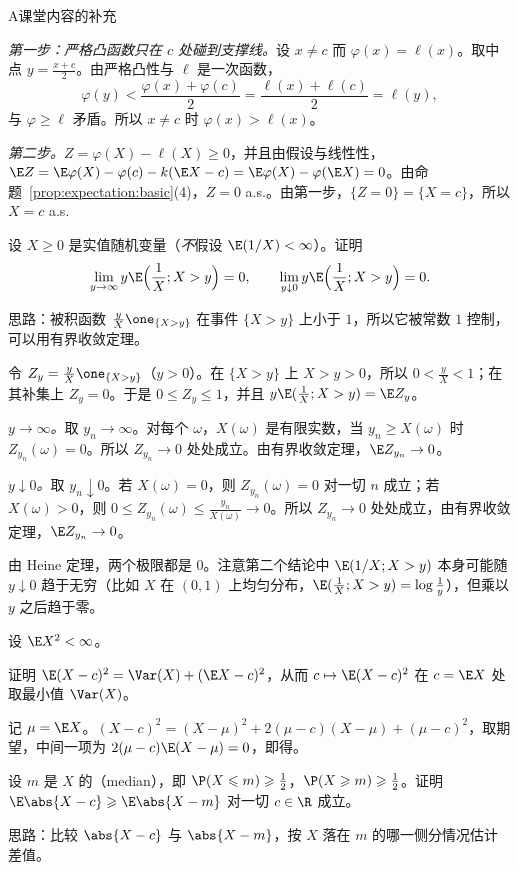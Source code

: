 \begin{exercises}{A}{课堂内容的补充}
\begin{solution}
\emph{第一步：严格凸函数只在 $c$ 处碰到支撑线。}设 $x\neq c$ 而 $\varphi(x)=\ell(x)$。取中点 $y=\frac{x+c}2$。由严格凸性与 $\ell$ 是一次函数，
\[
\varphi(y)<\frac{\varphi(x)+\varphi(c)}2=\frac{\ell(x)+\ell(c)}2=\ell(y),
\]
与 $\varphi\geqslant\ell$ 矛盾。所以 $x\neq c$ 时 $\varphi(x)>\ell(x)$。

\emph{第二步。}$Z=\varphi(X)-\ell(X)\geqslant0$，并且由假设与线性性，$\E Z=\E\varphi(X)-\varphi(c)-k(\E X-c)=\E\varphi(X)-\varphi(\E X)=0$。由命题~\ref{prop:expectation:basic}(4)，$Z=0$ a.s.。由第一步，$\{Z=0\}=\{X=c\}$，所以 $X=c$ a.s.
\end{solution}

\item\label{ex:expectation:A7} 设 $X\geqslant0$ 是实值随机变量（\emph{不}假设 $\E(1/X)<\infty$）。证明
\[
\lim_{y\to\infty}y\E\Bigl(\frac1X;X>y\Bigr)=0,\qquad\lim_{y\downarrow0}y\E\Bigl(\frac1X;X>y\Bigr)=0 .
\]
\begin{solution}
思路：被积函数 $\frac yX\one_{\{X>y\}}$ 在事件 $\{X>y\}$ 上小于 $1$，所以它被常数 $1$ 控制，可以用有界收敛定理。

令 $Z_y=\frac yX\one_{\{X>y\}}$（$y>0$）。在 $\{X>y\}$ 上 $X>y>0$，所以 $0<\frac yX<1$；在其补集上 $Z_y=0$。于是 $0\leqslant Z_y\leqslant1$，并且 $y\E(\frac1X;X>y)=\E Z_y$。

\emph{$y\to\infty$。}取 $y_n\to\infty$。对每个 $\omega$，$X(\omega)$ 是有限实数，当 $y_n\geqslant X(\omega)$ 时 $Z_{y_n}(\omega)=0$。所以 $Z_{y_n}\to0$ 处处成立。由有界收敛定理，$\E Z_{y_n}\to0$。

\emph{$y\downarrow0$。}取 $y_n\downarrow0$。若 $X(\omega)=0$，则 $Z_{y_n}(\omega)=0$ 对一切 $n$ 成立；若 $X(\omega)>0$，则 $0\leqslant Z_{y_n}(\omega)\leqslant\frac{y_n}{X(\omega)}\to0$。所以 $Z_{y_n}\to0$ 处处成立，由有界收敛定理，$\E Z_{y_n}\to0$。

由 Heine 定理，两个极限都是 $0$。注意第二个结论中 $\E(1/X;X>y)$ 本身可能随 $y\downarrow0$ 趋于无穷（比如 $X$ 在 $(0,1)$ 上均匀分布，$\E(\frac1X;X>y)=\log\frac1y$），但乘以 $y$ 之后趋于零。
\end{solution}

\item\label{ex:expectation:A8} 设 $\E X^2<\infty$。
\begin{questions}
\item 证明 $\E(X-c)^2=\Var(X)+(\E X-c)^2$，从而 $c\mapsto \E(X-c)^2$ 在 $c=\E X$ 处取最小值 $\Var(X)$。
\begin{solution}
记 $\mu=\E X$。$(X-c)^2=(X-\mu)^2+2(\mu-c)(X-\mu)+(\mu-c)^2$，取期望，中间一项为 $2(\mu-c)\E(X-\mu)=0$，即得。
\end{solution}
\item 设 $m$ 是 $X$ 的（median），即 $\P(X\leqslant m)\geqslant\frac12$，$\P(X\geqslant m)\geqslant\frac12$。证明 $\E\abs{X-c}\geqslant \E\abs{X-m}$ 对一切 $c\in\R$ 成立。
\begin{solution}
思路：比较 $\abs{X-c}$ 与 $\abs{X-m}$，按 $X$ 落在 $m$ 的哪一侧分情况估计差值。


\end{solution}
\end{questions}
\end{exercises}
